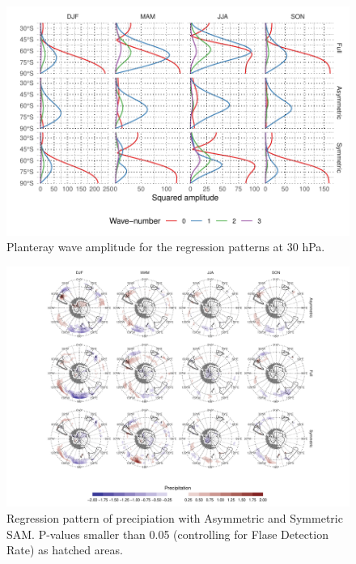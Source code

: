 \documentclass[]{ametsocV5}
\begin{document}
\begin{figure}
\includegraphics{wave-amplitude-30-1} \caption[Planteray wave amplitude for the regression patterns at 30 hPa]{Planteray wave amplitude for the regression patterns at 30 hPa.}\label{fig:wave-amplitude-30}
\end{figure}

\begin{figure}
\includegraphics{pp-regr-global-1} \caption[Regression pattern of precipiation with Asymmetric and Symmetric SAM]{Regression pattern of precipiation with Asymmetric and Symmetric SAM. P-values smaller than 0.05 (controlling for Flase Detection Rate) as hatched areas.}\label{fig:pp-regr-global}
\end{figure}
\end{document}
